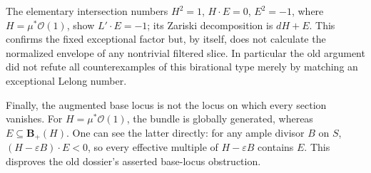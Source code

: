 The elementary intersection numbers \(H^2=1\), \(H\cdot E=0\),
\(E^2=-1\), where \(H=\mu^*\mathcal O(1)\), show
\(L'\cdot E=-1\); its Zariski decomposition is \(dH+E\).
This confirms the fixed exceptional factor but, by itself, does not
calculate the normalized envelope of any nontrivial filtered slice.
In particular the old argument did not refute all counterexamples of
this birational type merely by matching an exceptional Lelong number.

Finally, the augmented base locus is not the locus on which every
section vanishes.  For \(H=\mu^*\mathcal O(1)\), the bundle is globally
generated, whereas \(E\subseteq\mathbf B_+(H)\).
One can see the latter directly: for any ample divisor \(B\) on \(S\),
\((H-\varepsilon B)\cdot E<0\), so every effective multiple of
\(H-\varepsilon B\) contains \(E\).
This disproves the old dossier's asserted base-locus obstruction.


